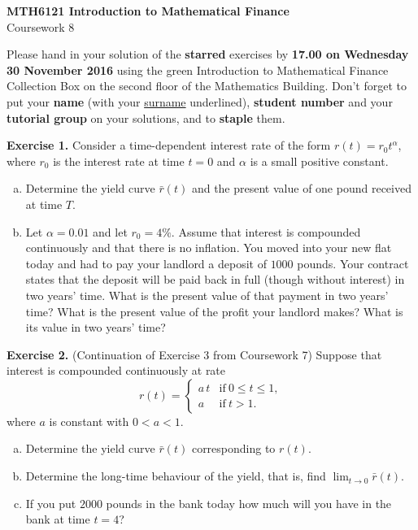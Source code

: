 \documentclass[11pt,a4paper]{report}
\begin{document}
    \begin{center}
        \LARGE\textbf{MTH6121 Introduction to Mathematical Finance}\\
        Coursework 8
    \end{center}
    Please hand in your solution of the \textbf{starred} exercises by \textbf{17.00 on Wednesday 30 November 2016} using the green Introduction to Mathematical Finance Collection Box on the second floor of the Mathematics Building. Don’t forget to put your \textbf{name} (with your \underline{surname} underlined), \textbf{student number} and your \textbf{tutorial group} on your solutions, and to \textbf{staple} them.\par 
    \textbf{Exercise 1.} Consider a time-dependent interest rate of the form $r(t)=r_0t^\alpha$, where $r_0$ is the interest rate at time $t = 0$ and $\alpha$ is a small positive constant.
    \begin{enumerate}[(a)]
        \item Determine the yield curve $\bar{r}(t)$ and the present value of one pound received at time $T$.
        \item Let $\alpha = 0.01$ and let $r_0 = 4\%$. Assume that interest is compounded continuously and that there is no inflation. You moved into your new flat today and had to pay your landlord a deposit of $1000$ pounds. Your contract states that the deposit will be paid back in full (though without interest) in two years’ time. What is the present value of that payment in two years’ time? What is the present value of the profit your landlord makes? What is its value in two years’ time?
    \end{enumerate}
    \textbf{Exercise 2.} (Continuation of Exercise 3 from Coursework 7) Suppose that interest is compounded continuously at rate
    $$
    r(t)
    =
    \begin{cases}
        a\, t & \text{if}\ 0 \leq t \leq 1,\\
        a & \text{if}\ t>1.
    \end{cases}
    $$
    where $a$ is constant with $0 < a < 1$.
    \begin{enumerate}[(a)]
        \item Determine the yield curve $\bar{r}(t)$ corresponding to $r(t)$.
        \item Determine the long-time behaviour of the yield, that is, find $\lim_{t \to 0}\bar{r}(t)$.
        \item If you put $2000$ pounds in the bank today how much will you have in the bank at time $t = 4$?
    \end{enumerate}
\end{document}
